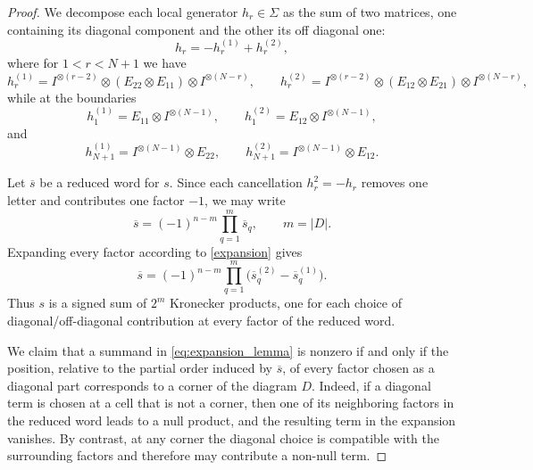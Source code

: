 \documentclass{article}
\begin{document}
\begin{proof}

We decompose each local generator $h_r\in\Sigma$ as the sum of two matrices, one containing its diagonal component and the other its off diagonal one:
\begin{equation}
    \label{expansion}
    h_r=-h_r^{(1)}+h_r^{(2)},
\end{equation}
where for $1<r<N+1$ we have
\[
h_r^{(1)}=I^{\otimes (r-2)}\otimes(E_{22}\otimes E_{11})\otimes I^{\otimes (N-r)},
\qquad
h_r^{(2)}=I^{\otimes (r-2)}\otimes(E_{12}\otimes E_{21})\otimes I^{\otimes (N-r)},
\]
while at the boundaries
\[
h_{1}^{(1)}=E_{11}\otimes I^{\otimes (N-1)},\qquad
h_{1}^{(2)}=E_{12}\otimes I^{\otimes (N-1)},
\]
and
\[
h_{N+1}^{(1)}=I^{\otimes (N-1)}\otimes E_{22},\qquad
h_{N+1}^{(2)}=I^{\otimes (N-1)}\otimes E_{12}.
\]

Let $\overline{s}$ be a reduced word for $s$. Since each cancellation $h_r^2=-h_r$ removes one letter and contributes one factor $-1$, we may write
\[
\overline{s}=(-1)^{n-m}\prod_{q=1}^{m}\overline{s}_q,
\qquad m=|D|.
\]
Expanding every factor according to \eqref{expansion} gives
\begin{equation}
\label{eq:expansion_lemma}
\overline{s}=(-1)^{n-m}\prod_{q=1}^{m}\bigl(\overline{s}_q^{(2)}-\overline{s}_q^{(1)}\bigr).
\end{equation}
Thus $s$ is a signed sum of $2^m$ Kronecker products, one for each choice of diagonal/off-diagonal contribution at every factor of the reduced word.

We claim that a summand in \eqref{eq:expansion_lemma} is nonzero if and only if the position, relative to the partial order induced by $\overline{s}$, of every factor chosen as a diagonal part corresponds to a corner of the diagram $D$. Indeed, if a diagonal term is chosen at a cell that is not a corner, then one of its neighboring factors in the reduced word leads to a null product, and the resulting term in the expansion vanishes. By contrast, at any corner the diagonal choice is compatible with the surrounding factors and therefore may contribute a non-null term.


\end{proof}
\end{document}
